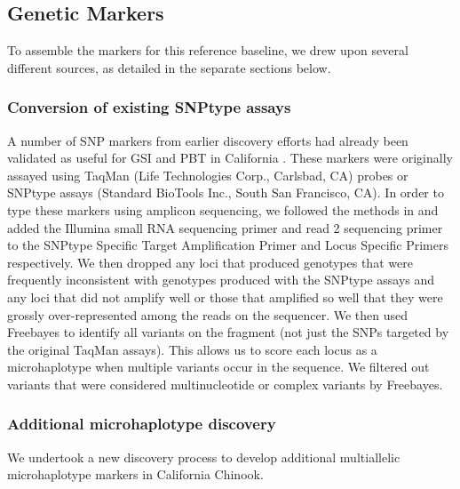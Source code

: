 \subsection*{Genetic Markers}

To assemble the markers for this reference baseline, we drew upon several different
sources, as detailed in the separate sections below.

\subsubsection*{Conversion of existing SNPtype assays}

A number of SNP markers from earlier discovery efforts \citep{clemento2011discovery} had already 
been validated as useful for GSI
and PBT in California \citep{clemento2014evaluation}. These markers were originally assayed
using TaqMan (Life Technologies Corp., Carlsbad, CA) probes or SNPtype assays (Standard BioTools Inc., South San Francisco, CA).
In order to type these markers using amplicon sequencing, we followed the methods in
\citet{campbell2015genotyping} and added the Illumina small RNA sequencing primer and 
read 2 sequencing primer to the SNPtype Specific Target Amplification Primer and Locus 
Specific Primers respectively.  We then dropped any loci that produced genotypes that were 
frequently inconsistent with genotypes produced with the SNPtype assays and any loci that 
did not amplify well or those that amplified so well that they were grossly over-represented
among the reads on the sequencer.  We then 
used Freebayes \citep{garrison2012haplotype} to identify all variants on the fragment (not just the SNPs targeted by the original TaqMan assays).  This allows us to score each locus as a
microhaplotype \citep{baetscher2018microhaplotypes} when multiple variants occur in the sequence.  We filtered out variants
that were considered multinucleotide or complex variants by Freebayes.

\subsubsection*{Additional microhaplotype discovery}

We undertook a new discovery process to develop additional multiallelic
microhaplotype \citep{baetscher2018microhaplotypes} markers in California Chinook.

